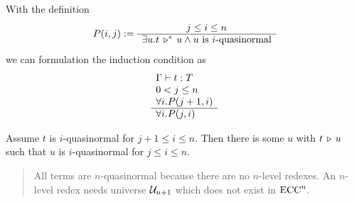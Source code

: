 With the definition
$$
P(i,j) :=
\begin{array}{c} j \le i \le n \\ \hline \exists u. t \,\triangleright^*\, u \land u \text{ is $i$-quasinormal}\end{array}
$$
%
we can formulation the induction condition as
$$
\begin{array}{l} 
  \Gamma \vdash t : T
  \\
  0 < j \le n
  \\
  \forall i. P(j+1,i)
 \\ \hline 
  \forall i. P(j,i)
\end{array}
$$



Assume $t$ is $i$-quasinormal for $j+1 \le i \le n$. Then there is some $u$
with $t \,\triangleright\, u$ such that $u$ is $i$-quasinormal for $j \le i \le n$.

\begin{quote}
  All terms are $n$-quasinormal because there are no $n$-level redexes. An
  $n$-level redex needs universe ${\cal U}_{n+1}$ which does not exist in $\text{ECC}^n$.
\end{quote}

